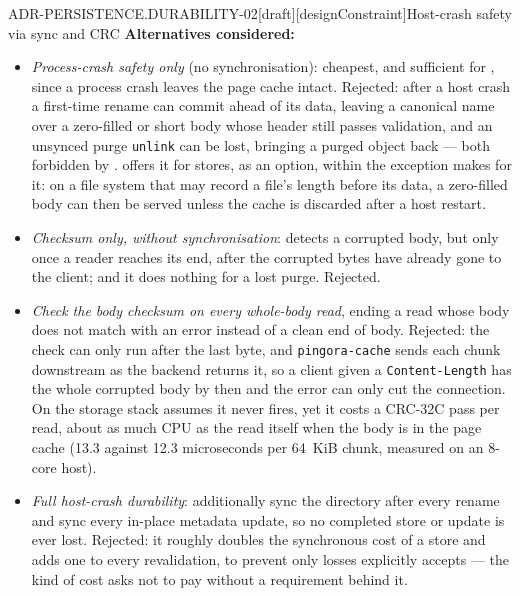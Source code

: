 \begin{requirement}{ADR-PERSISTENCE.DURABILITY-02}[draft][designConstraint]{Host-crash safety via sync and CRC}
  \textbf{Alternatives considered:}
  \begin{itemize}
    \item \emph{Process-crash safety only} (no synchronisation): cheapest,
      and sufficient for , since a process
      crash leaves the page cache intact. Rejected: after a host crash a
      first-time rename can commit ahead of its data, leaving a canonical name
      over a zero-filled or short body whose header still passes validation,
      and an unsynced purge \texttt{unlink} can be lost, bringing a purged
      object back --- both forbidden by .
       offers it for stores, as an
      option, within the exception 
      makes for it: on a file system that may record a file's length before
      its data, a zero-filled body can then be served unless the cache is
      discarded after a host restart.
    \item \emph{Checksum only, without synchronisation}: detects a corrupted
      body, but only once a reader reaches its end, after the corrupted bytes
      have already gone to the client; and it does nothing for a lost purge.
      Rejected.
    \item \emph{Check the body checksum on every whole-body read}, ending a
      read whose body does not match with an error instead of a clean end of
      body. Rejected: the check can only run after the last byte, and
      \texttt{pingora-cache} sends each chunk downstream as the backend
      returns it, so a client given a \texttt{Content-Length} has the whole
      corrupted body by then and the error can only cut the connection. On
      the storage stack  assumes it never
      fires, yet it costs a CRC-32C pass per read, about as much CPU as the
      read itself when the body is in the page cache (13.3 against 12.3
      microseconds per 64~KiB chunk, measured on an 8-core host).
    \item \emph{Full host-crash durability}: additionally sync the directory
      after every rename and sync every in-place metadata update, so no
      completed store or update is ever lost. Rejected: it roughly doubles the
      synchronous cost of a store and adds one to every revalidation, to
      prevent only losses  explicitly
      accepts --- the kind of cost  asks not to pay
      without a requirement behind it.
  \end{itemize}


\end{requirement}
